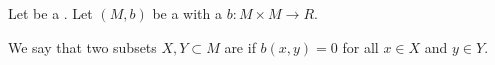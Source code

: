 \begin{definition} \label{definition:orthogonal_subset_of_a_module_with_a_sesquilinear_form_over_a_ring_with_involution}
    Let  be a . Let $(M,b)$ be a  with a  $b: M \times M \to R$.

    We say that two subsets $X,Y \subset M$ are  if $b(x,y) = 0$ for all $x \in X$ and $y \in Y$.
\end{definition}